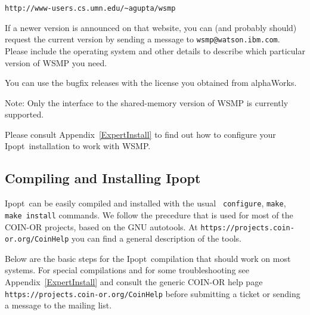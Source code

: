 \documentclass[10pt]{article}
\newcommand{\Ipopt}{{\sc Ipopt}}
\begin{document}
{\tt http://www-users.cs.umn.edu/\verb|~|agupta/wsmp}

If a newer version is announced on that website, you can (and
probably should) request the current version by sending a message to
\verb|wsmp@watson.ibm.com|.  Please include the operating system and
other details to describe which particular version of WSMP you need.

You can use the bugfix releases with the license you obtained from
alphaWorks.

Note: Only the interface to the shared-memory version of WSMP is
currently supported.

Please consult Appendix~\ref{ExpertInstall} to find out how to
configure your \Ipopt\ installation to work with WSMP.

\subsection{Compiling and Installing \Ipopt} \label{sec.comp_and_inst}

\Ipopt\ can be easily compiled and installed with the usual {\tt
  configure}, {\tt make}, {\tt make install} commands.  We follow the
precedure that is used for most of the COIN-OR projects, based on the
GNU autotools.  At \texttt{https://projects.coin-or.org/CoinHelp}
you can find a general description of the tools.

Below are the basic steps for the \Ipopt\ compilation that should work
on most systems.  For special compilations and for some
troubleshooting see Appendix~\ref{ExpertInstall} and consult the
generic COIN-OR help page
\texttt{https://projects.coin-or.org/CoinHelp} before submitting a
ticket or sending a message to the mailing list.
\end{document}
